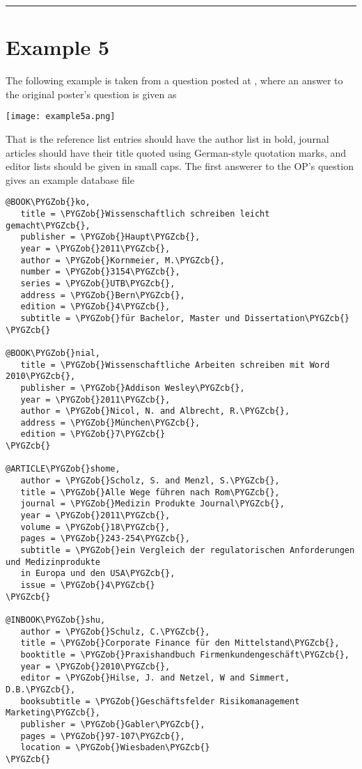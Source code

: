 \documentclass[letterpaper,10pt,english]{sphinxmanual}
\def\PYGZob{\char`\{}
\def\PYGZcb{\char`\}}
\begin{document}
\bigskip\hrule{}\bigskip



\section{Example 5}
\label{examples:example-5}
The following example is taken from a question posted at , where an answer to the original poster's question is given as

\texttt{[image: example5a.png]}

That is the reference list entries should have the author list in bold, journal articles should have their title quoted using German-style quotation marks, and editor lists should be given in small caps. The first answerer to the OP's question gives an example database file

\begin{Verbatim}[commandchars=\\\{\}]
@BOOK\PYGZob{}ko,
   title = \PYGZob{}Wissenschaftlich schreiben leicht gemacht\PYGZcb{},
   publisher = \PYGZob{}Haupt\PYGZcb{},
   year = \PYGZob{}2011\PYGZcb{},
   author = \PYGZob{}Kornmeier, M.\PYGZcb{},
   number = \PYGZob{}3154\PYGZcb{},
   series = \PYGZob{}UTB\PYGZcb{},
   address = \PYGZob{}Bern\PYGZcb{},
   edition = \PYGZob{}4\PYGZcb{},
   subtitle = \PYGZob{}für Bachelor, Master und Dissertation\PYGZcb{}
\PYGZcb{}

@BOOK\PYGZob{}nial,
   title = \PYGZob{}Wissenschaftliche Arbeiten schreiben mit Word 2010\PYGZcb{},
   publisher = \PYGZob{}Addison Wesley\PYGZcb{},
   year = \PYGZob{}2011\PYGZcb{},
   author = \PYGZob{}Nicol, N. and Albrecht, R.\PYGZcb{},
   address = \PYGZob{}München\PYGZcb{},
   edition = \PYGZob{}7\PYGZcb{}
\PYGZcb{}

@ARTICLE\PYGZob{}shome,
   author = \PYGZob{}Scholz, S. and Menzl, S.\PYGZcb{},
   title = \PYGZob{}Alle Wege führen nach Rom\PYGZcb{},
   journal = \PYGZob{}Medizin Produkte Journal\PYGZcb{},
   year = \PYGZob{}2011\PYGZcb{},
   volume = \PYGZob{}18\PYGZcb{},
   pages = \PYGZob{}243-254\PYGZcb{},
   subtitle = \PYGZob{}ein Vergleich der regulatorischen Anforderungen und Medizinprodukte
   in Europa und den USA\PYGZcb{},
   issue = \PYGZob{}4\PYGZcb{}
\PYGZcb{}

@INBOOK\PYGZob{}shu,
   author = \PYGZob{}Schulz, C.\PYGZcb{},
   title = \PYGZob{}Corporate Finance für den Mittelstand\PYGZcb{},
   booktitle = \PYGZob{}Praxishandbuch Firmenkundengeschäft\PYGZcb{},
   year = \PYGZob{}2010\PYGZcb{},
   editor = \PYGZob{}Hilse, J. and Netzel, W and Simmert, D.B.\PYGZcb{},
   booksubtitle = \PYGZob{}Geschäftsfelder Risikomanagement Marketing\PYGZcb{},
   publisher = \PYGZob{}Gabler\PYGZcb{},
   pages = \PYGZob{}97-107\PYGZcb{},
   location = \PYGZob{}Wiesbaden\PYGZcb{}
\PYGZcb{}
\end{Verbatim}
\end{document}
